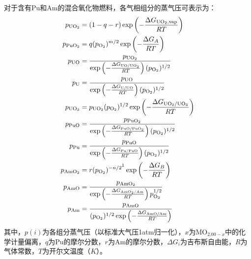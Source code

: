 对于含有Pu和Am的混合氧化物燃料，各气相组分的蒸气压可表示为：
\begin{equation}
\begin{aligned}
	p_{\text{UO}_2} &= (1 - q - r) \exp \left( -\frac{\Delta G_{\text{UO}_2,\text{vap}}}{RT} \right) \\
	p_{\text{PuO}_2} &= q (p_{\text{O}_2})^{m/2} \exp \left( -\frac{\Delta G_A}{RT} \right) \\
	p_{\text{UO}} &= \frac{p_{\text{UO}_2}}{\exp \left( -\frac{\Delta G_{\text{UO/UO}_2}}{RT} \right) (p_{\text{O}_2})^{1/2}} \\
	p_{\text{U}} &= \frac{p_{\text{UO}}}{\exp \left( -\frac{\Delta G_{\text{U/UO}}}{RT} \right) (p_{\text{O}_2})^{1/2}} \\
	p_{\text{UO}_3} &= p_{\text{UO}_2} (p_{\text{O}_2})^{1/2} \exp \left( -\frac{\Delta G_{\text{UO}_2/\text{UO}_3}}{RT} \right) \\
	p_{\text{PuO}} &= \frac{p_{\text{PuO}_2}}{\exp \left( -\frac{\Delta G_{\text{PuO/PuO}_2}}{RT} \right) (p_{\text{O}_2})^{1/2}} \\
	p_{\text{Pu}} &= \frac{p_{\text{PuO}}}{\exp \left( -\frac{\Delta G_{\text{Pu/PuO}}}{RT} \right) (p_{\text{O}_2})^{1/2}} \\
	p_{\text{AmO}_2} &= r (p_{\text{O}_2})^{-n/2\footnotemark} \exp \left( -\frac{\Delta G_B}{RT} \right) \\
	p_{\text{AmO}} &= \frac{p_{\text{AmO}_2}}{\exp \left( -\frac{\Delta G_{\text{AmO}_2/\text{Am}}}{RT} \right) p_{\text{O}_2}^{1/2}} \\
	p_{\text{Am}} &= \frac{p_{\text{AmO}}}{(p_{\text{O}_2})^{1/2} \exp \left( -\frac{\Delta G_{\text{AmO/Am}}}{RT} \right)}
\end{aligned}
\label{eq:app_b_rand_markin_vapor_pressures}
\end{equation}
其中，$p(i)$为各组分蒸气压（以标准大气压1atm归一化），$x$为$\text{MO}_{2.00-x}$中的化学计量偏离，$q$为Pu的摩尔分数，$r$为Am的摩尔分数，$\Delta G_i$为吉布斯自由能，$R$为气体常数，$T$为开尔文温度（$K$）。


